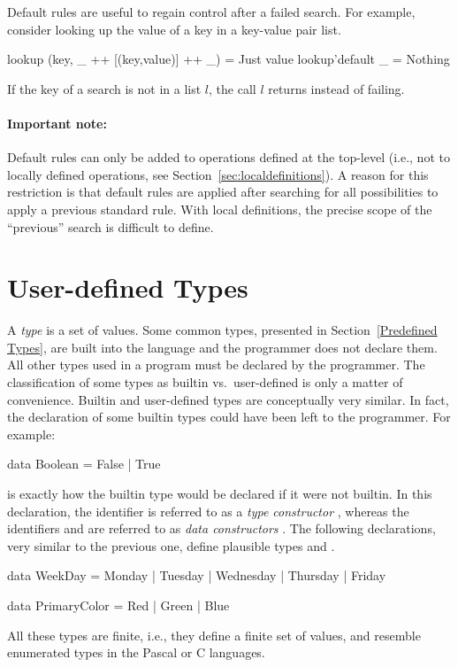 Default rules are useful to regain control after a failed search.  For
example, consider looking up the value of a key in a key-value pair list.
%
\begin{curry}
  lookup (key, _ ++ [(key,value)] ++ _) = Just value
  lookup'default _ = Nothing
\end{curry}
%
If the key of a search is not in a list $l$, the call
 $l$ returns  instead of failing.

\paragraph{Important note:}
Default rules can only be added to operations defined at the top-level
(i.e., not to locally defined operations,
see Section~\ref{sec:localdefinitions}).
A reason for this restriction is that default rules are applied
after searching for all possibilities to apply a previous standard rule.
With local definitions, the precise scope of the ``previous'' search
is difficult to define.


\section{User-defined Types}

A \emph{type} is a set of values.
Some common types, presented in Section~\ref{Predefined Types},
are built into the language
and the programmer does not declare them.
All other types used in a program must be declared by the programmer.
The classification of some types as builtin vs.~user-defined 
is only a matter of convenience.
Builtin and user-defined types are conceptually very similar.
In fact,
the declaration of some builtin types could have been left to the programmer.
For example:
%
\begin{curry}
data Boolean = False | True
\end{curry}
%
is exactly how the builtin  type would be declared
if it were not builtin.
In this declaration, the identifier 
is referred to as a \emph{type constructor}%
,
whereas the identifiers  and 
are referred to as \emph{data constructors}%
.
The following declarations, very similar to the previous one,
define plausible types  and .
%
\begin{curry}
data WeekDay = Monday | Tuesday | Wednesday | Thursday | Friday

data PrimaryColor = Red | Green | Blue
\end{curry}
%
All these types are finite, i.e., they define a finite set of values,
and resemble enumerated types in the Pascal or C languages.

